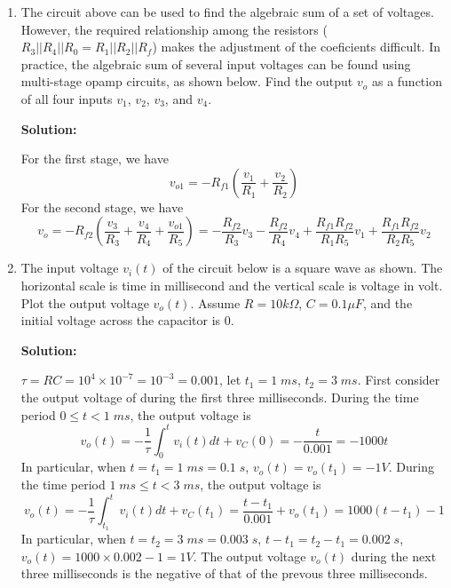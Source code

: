 \begin{enumerate}

{\bf Solution:} Assume $v-=v+=v$, then we have
\[ \frac{v_1-v}{R_1}+\frac{v_2-v}{R_2}=-\frac{v_o-v}{R_f},\;\;\;\;
\mbox{i.e.,}\;\;\;\;
	\frac{v_1}{R_1}+\frac{v_2}{R_2}+\frac{v_o}{R_f}
	=v(\frac{1}{R_1}+\frac{1}{R_2}+\frac{1}{R_f}) \]
also
\[ \frac{v_3-v}{R_3}+\frac{v_4-v}{R_4}=\frac{v}{R_o},\;\;\;\;
\mbox{i.e.,}\;\;\;\;
	\frac{v_3}{R_3}+\frac{v_4}{R_4}
	=v(\frac{1}{R_3}+\frac{1}{R_4}+\frac{1}{R_o}) \]
solve for $v$:
\[ v=(\frac{v_3}{R_3}+\frac{v_4}{R_4})/(\frac{1}{R_3}+
	\frac{1}{R_4}+\frac{1}{R_o}) \]
plug into the other equation:
\[ \frac{v_1}{R_1}+\frac{v_2}{R_2}+\frac{v_o}{R_f}
	=(\frac{v_3}{R_3}+\frac{v_4}{R_4})
	(\frac{1}{R_1}+\frac{1}{R_2}+\frac{1}{R_f})
	/(\frac{1}{R_3}+\frac{1}{R_4}+\frac{1}{R_o}) 
	=\frac{v_3}{R_3}+\frac{v_4}{R_4}	 \]
i.e.,
\[  v_o=R_f (-\frac{v_1}{R_1}-\frac{v_2}{R_2}+\frac{v_3}{R_3}+
	\frac{v_4}{R_4})	\]

\item The circuit above can be used to find the algebraic sum of a set 
of voltages. However, the required relationship among the resistors
($R_3 || R_4 || R_0=R_1 || R_2 || R_f$) makes the adjustment of the 
coeficients difficult. In practice, the algebraic sum of several
input voltages can be found using multi-stage opamp circuits, as 
shown below. Find the output $v_o$ as a function of all four inputs 
$v_1$, $v_2$, $v_3$, and $v_4$.


{\bf Solution:}

For the first stage, we have
\[	v_{o1}=-R_{f1}(\frac{v_1}{R_1}+\frac{v_2}{R_2})	\]
For the second stage, we have
\[	v_o=-R_{f2}(\frac{v_3}{R_3}+\frac{v_4}{R_4}+\frac{v_{o1}}{R_5})	
	=-\frac{R_{f2}}{R_3}v_3-\frac{R_{f2}}{R_4}v_4
	+\frac{R_{f1}R_{f2}}{R_1R_5}v_1+\frac{R_{f1}R_{f2}}{R_2R_5}v_2	
\]

\item The input voltage $v_i(t)$ of the circuit below is a square wave 
as shown. The horizontal scale is time in millisecond and the vertical 
scale is voltage in volt. Plot the output voltage $v_o(t)$. Assume
$R=10k\Omega$, $C=0.1\mu F$, and the initial voltage across the 
capacitor is 0.


{\bf Solution:} 

$\tau=RC=10^4\times 10^{-7}=10^{-3}=0.001$, let $t_1=1\;ms$, $t_2=3\;ms$. 
First consider the output voltage of during the first three milliseconds.
During the time period $0 \le t < 1\;ms$, the output voltage is
\[	v_o(t)=-\frac{1}{\tau}\int_0^t v_i(t) dt+v_C(0)
	=-\frac{t}{0.001}=-1000 t	\]
In particular, when $t=t_1=1\;ms=0.1\;s$, $v_o(t)=v_o(t_1)=-1V$. 
During the time period $1\;ms \le t < 3\;ms$, the output voltage is
\[	v_o(t)=-\frac{1}{\tau}\int_{t_1}^t v_i(t) dt+v_C(t_1)
	=\frac{t-t_1}{0.001}+v_o(t_1)=1000(t-t_1)-1	\]
In particular, when $t=t_2=3\;ms=0.003\;s$, $t-t_1=t_2-t_1=0.002\;s$,
$v_o(t)=1000\times 0.002-1=1V$.
The output voltage $v_o(t)$ during the next three milliseconds is the
negative of that of the prevous three milliseconds.


\end{enumerate}
